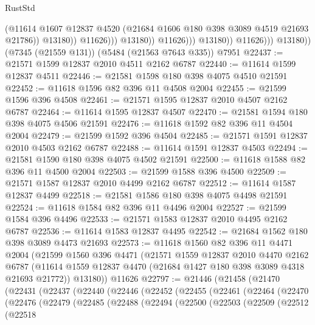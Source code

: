 \begin{lexlean}{RustStd}
\begin{coremodule}
                                      (@11614
                                        @1607
                                        @12837
                                        @4520
                                        (@21684 @1606 @180 @398 @3089 @4519 @21693 @21786))
                                      @13180))
                                  @11626)))
                            @13180))
                        @11626)))
                  @13180))
              @11626)))
        @13180))
    (@7345 (@21559 @131))
    (@5484 (@21563 @7643 @335))
    @7951
@22437 := @21571 @1599 @12837 @2010 @4511 @2162 @6787
@22440 := @11614 @1599 @12837 @4511
@22446 := @21581 @1598 @180 @398 @4075 @4510 @21591
@22452 := @11618 @1596 @82 @396 @11 @4508 @2004
@22455 := @21599 @1596 @396 @4508
@22461 := @21571 @1595 @12837 @2010 @4507 @2162 @6787
@22464 := @11614 @1595 @12837 @4507
@22470 := @21581 @1594 @180 @398 @4075 @4506 @21591
@22476 := @11618 @1592 @82 @396 @11 @4504 @2004
@22479 := @21599 @1592 @396 @4504
@22485 := @21571 @1591 @12837 @2010 @4503 @2162 @6787
@22488 := @11614 @1591 @12837 @4503
@22494 := @21581 @1590 @180 @398 @4075 @4502 @21591
@22500 := @11618 @1588 @82 @396 @11 @4500 @2004
@22503 := @21599 @1588 @396 @4500
@22509 := @21571 @1587 @12837 @2010 @4499 @2162 @6787
@22512 := @11614 @1587 @12837 @4499
@22518 := @21581 @1586 @180 @398 @4075 @4498 @21591
@22524 := @11618 @1584 @82 @396 @11 @4496 @2004
@22527 := @21599 @1584 @396 @4496
@22533 := @21571 @1583 @12837 @2010 @4495 @2162 @6787
@22536 := @11614 @1583 @12837 @4495
@22542 := @21684 @1562 @180 @398 @3089 @4473 @21693
@22573 := @11618
    @1560
    @82
    @396
    @11
    @4471
    @2004
    (@21599
      @1560
      @396
      @4471
      (@21571
        @1559
        @12837
        @2010
        @4470
        @2162
        @6787
        (@11614 @1559 @12837 @4470 (@21684 @1427 @180 @398 @3089 @4318 @21693 @21772))
        @13180))
    @11626
@22797 := @21446
    (@21458
      (@21470
        (@22431
          (@22437
            (@22440
              (@22446
                (@22452
                  (@22455
                    (@22461
                      (@22464
                        (@22470
                          (@22476
                            (@22479
                              (@22485
                                (@22488
                                  (@22494
                                    (@22500
                                      (@22503
                                        (@22509
                                          (@22512
                                            (@22518

\end{coremodule}
\end{lexlean}
